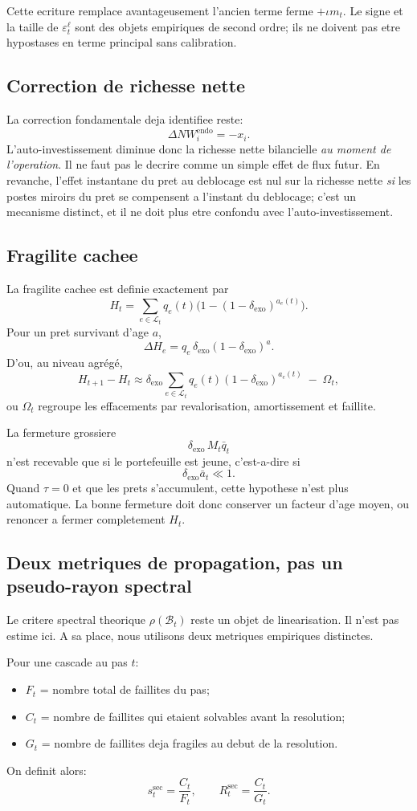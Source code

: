 \documentclass[11pt,a4paper]{article}
\begin{document}
Cette ecriture remplace avantageusement l'ancien terme ferme $+\iota m_t$. Le signe et la taille de $\varepsilon^\ell_t$ sont des objets empiriques de second ordre; ils ne doivent pas etre hypostases en terme principal sans calibration.

\subsection{Correction de richesse nette}
La correction fondamentale deja identifiee reste:
\[
\Delta NW_i^{\mathrm{endo}} = -x_i.
\]
L'auto-investissement diminue donc la richesse nette bilancielle \emph{au moment de l'operation}. Il ne faut pas le decrire comme un simple effet de flux futur. En revanche, l'effet instantane du pret au deblocage est nul sur la richesse nette \emph{si} les postes miroirs du pret se compensent a l'instant du deblocage; c'est un mecanisme distinct, et il ne doit plus etre confondu avec l'auto-investissement.

\subsection{Fragilite cachee}
La fragilite cachee est definie exactement par
\[
H_t = \sum_{e \in \mathcal L_t} q_e(t)\Big(1-(1-\delta_{\mathrm{exo}})^{a_e(t)}\Big).
\]
Pour un pret survivant d'age $a$,
\[
\Delta H_e
=
q_e\,\delta_{\mathrm{exo}}(1-\delta_{\mathrm{exo}})^a.
\]
D'ou, au niveau agrégé,
\[
H_{t+1}-H_t
\approx
\delta_{\mathrm{exo}}
\sum_{e \in \mathcal L_t}
q_e(t)(1-\delta_{\mathrm{exo}})^{a_e(t)}
\;-\;
\Omega_t,
\]
ou $\Omega_t$ regroupe les effacements par revalorisation, amortissement et faillite.

La fermeture grossiere
\[
\delta_{\mathrm{exo}}\,M_t\bar q_t
\]
n'est recevable que si le portefeuille est jeune, c'est-a-dire si
\[
\delta_{\mathrm{exo}}\bar a_t \ll 1.
\]
Quand $\tau=0$ et que les prets s'accumulent, cette hypothese n'est plus automatique. La bonne fermeture doit donc conserver un facteur d'age moyen, ou renoncer a fermer completement $H_t$.

\subsection{Deux metriques de propagation, pas un pseudo-rayon spectral}
Le critere spectral theorique $\rho(\mathcal B_t)$ reste un objet de linearisation. Il n'est pas estime ici. A sa place, nous utilisons deux metriques empiriques distinctes.

Pour une cascade au pas $t$:
\begin{itemize}
\item $F_t$ = nombre total de faillites du pas;
\item $C_t$ = nombre de faillites qui etaient solvables avant la resolution;
\item $G_t$ = nombre de faillites deja fragiles au debut de la resolution.
\end{itemize}
On definit alors:
\[
s_t^{\mathrm{sec}} = \frac{C_t}{F_t},
\qquad
R_t^{\mathrm{sec}} = \frac{C_t}{G_t}.
\]
\end{document}

